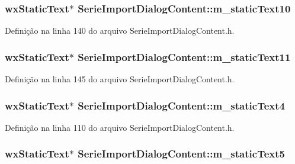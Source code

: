 \subsubsection[{m\+\_\+static\+Text10}]{\setlength{\rightskip}{0pt plus 5cm}wx\+Static\+Text$\ast$ Serie\+Import\+Dialog\+Content\+::m\+\_\+static\+Text10\hspace{0.3cm}{\ttfamily [protected]}}\label{class_serie_import_dialog_content_af2ea4001bece476957cbf4bcba18354a}


Definição na linha 140 do arquivo Serie\+Import\+Dialog\+Content.\+h.

\subsubsection[{m\+\_\+static\+Text11}]{\setlength{\rightskip}{0pt plus 5cm}wx\+Static\+Text$\ast$ Serie\+Import\+Dialog\+Content\+::m\+\_\+static\+Text11\hspace{0.3cm}{\ttfamily [protected]}}\label{class_serie_import_dialog_content_a075ee41a3d7b98957bab2e01d601baa6}


Definição na linha 145 do arquivo Serie\+Import\+Dialog\+Content.\+h.

\subsubsection[{m\+\_\+static\+Text4}]{\setlength{\rightskip}{0pt plus 5cm}wx\+Static\+Text$\ast$ Serie\+Import\+Dialog\+Content\+::m\+\_\+static\+Text4\hspace{0.3cm}{\ttfamily [protected]}}\label{class_serie_import_dialog_content_a473f440e37b51f57ea5f6df0660bf58a}


Definição na linha 110 do arquivo Serie\+Import\+Dialog\+Content.\+h.

\subsubsection[{m\+\_\+static\+Text5}]{\setlength{\rightskip}{0pt plus 5cm}wx\+Static\+Text$\ast$ Serie\+Import\+Dialog\+Content\+::m\+\_\+static\+Text5\hspace{0.3cm}{\ttfamily [protected]}}\label{class_serie_import_dialog_content_a7454a5e408db18440c83b2d586c33d11}



